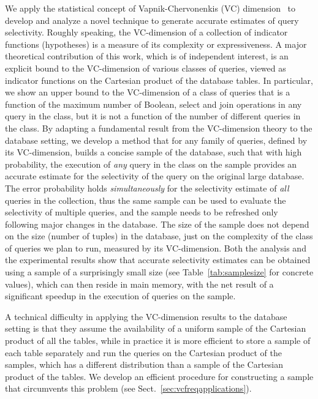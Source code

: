 We apply the statistical concept of Vapnik-Chervonenkis (VC)
dimension~\citep{VapnikC71} to develop and analyze a novel technique to generate
accurate estimates of query selectivity. Roughly speaking, the VC-dimension of a
collection of indicator functions (hypotheses) is a measure of its complexity or
expressiveness. A major
theoretical contribution of this work, which is of independent interest, is an
explicit bound to the VC-dimension of various classes of queries, viewed as
indicator functions on the
Cartesian product of the database tables. In particular, we show an upper bound
to the 
VC-dimension of a class of queries that is a function of the maximum number of
Boolean, select and join operations in any query in the class, but it is not
a function of the number of different queries in the class. By adapting a
fundamental result from the VC-dimension theory to the database setting, we
develop a method that for any family of queries, defined by its VC-dimension,
builds a concise sample of the database, such that with high probability, the
execution of \emph{any} query in the class on the sample provides an accurate
estimate for the selectivity of the query on the original large database. The
error probability holds \emph{simultaneously} for the selectivity estimate of
\emph{all} queries in the collection, thus the same sample can be used to
evaluate the selectivity of multiple queries, and the sample needs to be
refreshed only following major changes in the database. The size of the sample
does not depend on the size (number of tuples) in the database, just on the
complexity of the class of queries we plan to run, measured by its VC-dimension.
Both the analysis and the experimental results show that accurate selectivity
estimates can be obtained using a sample of a surprisingly small size (see
Table~\ref{tab:samplesize} for concrete values), which can then reside in main
memory, with the net result of a significant speedup in the execution of
queries on the sample. 

A technical difficulty in applying the VC-dimension results to the database
setting is that they assume the availability of a uniform sample of the
Cartesian product of all the tables, while in practice it is more efficient to
store a sample of each table separately and run the queries on the Cartesian
product of the samples, which has a different distribution than a sample of the
Cartesian product of the tables. We develop an efficient  procedure for
constructing a sample that circumvents this problem (see
Sect.~\ref{sec:vcfreqapplications}).

